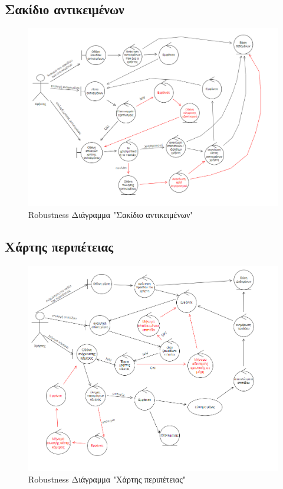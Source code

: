 \subsection{Σακίδιο αντικειμένων}
\begin{figure}[!htb]
  \centering
    \begin{center}
    \includegraphics[width=\textwidth]{robust_items.png}
    \caption{Robustness Διάγραμμα "Σακίδιο αντικειμένων"}
    \label{}
     \end{center}
\end{figure}
\newpage


\subsection{Χάρτης περιπέτειας}
\begin{figure}[!htb]
  \begin{center}
    \includegraphics[width=\textwidth]{robust_map.png}
    \caption{Robustness Διάγραμμα "Χάρτης περιπέτειας"}
    \label{}
     \end{center}
\end{figure}
\newpage


